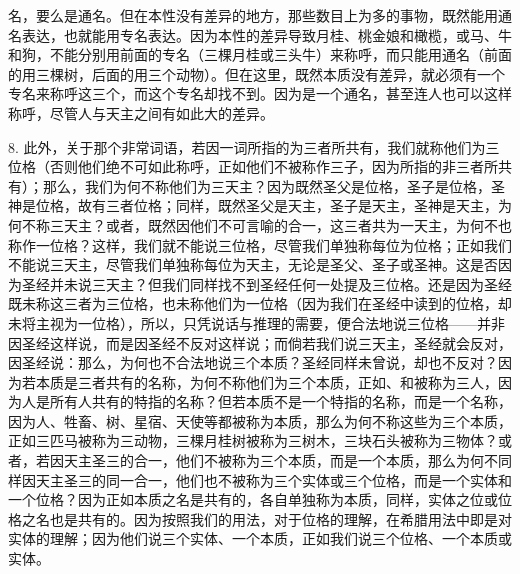 名，要么是通名。但在本性没有差异的地方，那些数目上为多的事物，既然能用通名表达，也就能用专名表达。因为本性的差异导致月桂、桃金娘和橄榄，或马、牛和狗，不能分别用前面的专名（三棵月桂或三头牛）来称呼，而只能用通名（前面的用三棵树，后面的用三个动物）。但在这里，既然本质没有差异，就必须有一个专名来称呼这三个，而这个专名却找不到。因为是一个通名，甚至连人也可以这样称呼，尽管人与天主之间有如此大的差异。\par

8. 此外，关于那个非常词语，若因一词所指的为三者所共有，我们就称他们为三位格（否则他们绝不可如此称呼，正如他们不被称作三子，因为所指的非三者所共有）；那么，我们为何不称他们为三天主？因为既然圣父是位格，圣子是位格，圣神是位格，故有三者位格；同样，既然圣父是天主，圣子是天主，圣神是天主，为何不称三天主？或者，既然因他们不可言喻的合一，这三者共为一天主，为何不也称作一位格？这样，我们就不能说三位格，尽管我们单独称每位为位格；正如我们不能说三天主，尽管我们单独称每位为天主，无论是圣父、圣子或圣神。这是否因为圣经并未说三天主？但我们同样找不到圣经任何一处提及三位格。还是因为圣经既未称这三者为三位格，也未称他们为一位格（因为我们在圣经中读到的位格，却未将主视为一位格），所以，只凭说话与推理的需要，便合法地说三位格——并非因圣经这样说，而是因圣经不反对这样说；而倘若我们说三天主，圣经就会反对，因圣经说：那么，为何也不合法地说三个本质？圣经同样未曾说，却也不反对？因为若本质是三者共有的名称，为何不称他们为三个本质，正如、和被称为三人，因为人是所有人共有的特指的名称？但若本质不是一个特指的名称，而是一个名称，因为人、牲畜、树、星宿、天使等都被称为本质，那么为何不称这些为三个本质，正如三匹马被称为三动物，三棵月桂树被称为三树木，三块石头被称为三物体？或者，若因天主圣三的合一，他们不被称为三个本质，而是一个本质，那么为何不同样因天主圣三的同一合一，他们也不被称为三个实体或三个位格，而是一个实体和一个位格？因为正如本质之名是共有的，各自单独称为本质，同样，实体之位或位格之名也是共有的。因为按照我们的用法，对于位格的理解，在希腊用法中即是对实体的理解；因为他们说三个实体、一个本质，正如我们说三个位格、一个本质或实体。\par

